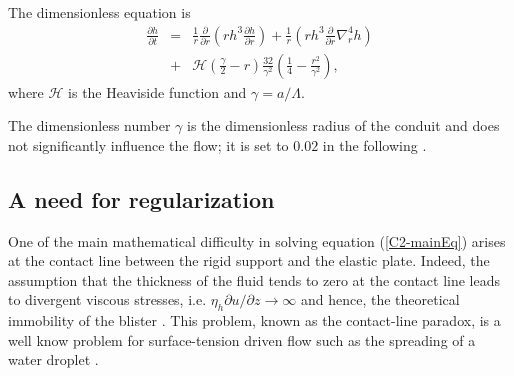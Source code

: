 The dimensionless equation is
\begin{eqnarray}
  \frac{\partial h}{\partial t}& =&\frac{1}{ r}
                                    \frac{\partial}{\partial r}  \left( rh^3  \frac{\partial h}{\partial
                                    r}\right)+\frac{1}{ r} \left( rh^3
                                    \frac{\partial}{\partial
                                    r}\nabla_r^4h\right)\nonumber\\
                               &+&
                                   \mathcal{H}(\frac{\gamma}{2}-r)\frac{32}{\gamma^{2}}\left(\frac{1}{4}-\frac{r^{2}}{\gamma^{2}}\right),
                                   \label{C2-mainEq}
\end{eqnarray}
where $\mathcal{H}$ is the Heaviside function and $\gamma=a/\Lambda$.

The dimensionless number  $\gamma$ is the dimensionless  radius of the
conduit and  does not significantly influence  the flow; it is  set to
$0.02$ in the following \citep{Michaut:2009jx,Michaut:2011kg}.
	 
\subsection{A need for regularization}
\label{C2-sec:need-regularization}

One  of   the  main   mathematical  difficulty  in   solving  equation
(\ref{C2-mainEq}) arises at the contact line between the rigid support
and the elastic  plate.  Indeed, the assumption that  the thickness of
the fluid tends to zero at the contact line leads to divergent viscous
stresses, i.e.   $\eta_h \partial u/\partial z\rightarrow  \infty$ and
hence,     the    theoretical     immobility     of    the     blister
\citep{Flitton:1999iv,Lister:2013ia,Anonymous:QWXp_4JV}. This problem,
known  as  the  contact-line  paradox,  is a  well  know  problem  for
surface-tension driven flow  such as the spreading of  a water droplet
\citep{Bertozzi:1998wz,Snoeijer:2013cm}.

